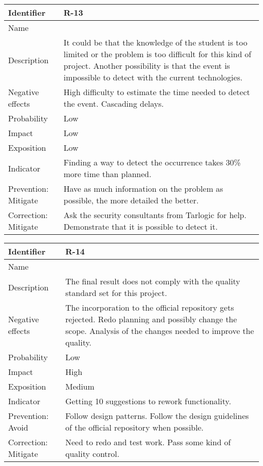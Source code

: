 \begin{table}[H]
	\begin{tabularx}{\textwidth}{|y|z|}
		\hline
		Identifier & \textbf{R-13} \\ \hline
		Name & \Rtrece \\ \hline
		Description &
			It could be that the knowledge of the student is too limited or the problem is too difficult for this kind of project.\linej
			Another possibility is that the event is impossible to detect with the current technologies.
		\\ \hline
		Negative effects &
			High difficulty to estimate the time needed to detect the event. \linej
			Cascading delays.
		\\ \hline
		Probability & Low\\ \hline
		Impact &  Low\\ \hline
		Exposition &  Low\\ \hline
		Indicator & Finding a way to detect the occurrence takes 30\% more time than planned.\\ \hline
		Prevention: Mitigate &
			Have as much information on the problem as possible, the more detailed the better.
		\\ \hline
		Correction: Mitigate &
			Ask the security consultants from Tarlogic for help. \linej
			Demonstrate that it is possible to detect it.
		\\ \hline
	\end{tabularx}
\end{table}

\begin{table}[H]
	\begin{tabularx}{\textwidth}{|y|z|}
		\hline
		Identifier & \textbf{R-14} \\ \hline
		Name & \Rcatorce \\ \hline
		Description &
			The final result does not comply with the quality standard set for this project.
		\\ \hline
		Negative effects &
			The incorporation to the official repository gets rejected.\linej
			Redo planning and possibly change the scope.  \linej
			Analysis of the changes needed to improve the quality.
		\\ \hline
		Probability & Low\\ \hline
		Impact &  High\\ \hline
		Exposition &  Medium\\ \hline
		Indicator & Getting 10 suggestions to rework functionality.\\ \hline
		Prevention: Avoid &
			Follow design patterns. \linej
			Follow the design guidelines of the official repository when possible.
		\\ \hline
		Correction: Mitigate &
			Need to redo and test work. \linej
			Pass some kind of quality control.
		\\ \hline
	\end{tabularx}
\end{table}

